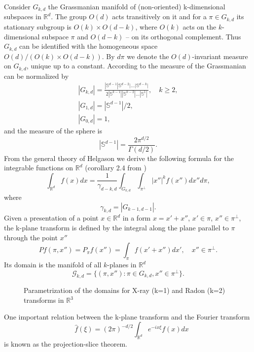 \documentclass[12pt]{iopart}
\begin{document}
	Consider $G_{k,d}$ the Grassmanian manifold of (non-oriented) k-dimensional subspaces in $\mathbb R^d$. The group $O(d)$ acts transitively on it and for a $\pi\in G_{k,d}$ its stationary subgroup is $O(k)\times O(d-k)$, where $O(k)$ acts on the $k$-dimensional subspace $\pi$ and $O(d-k)$ -- on its orthogonal complement. Thus $G_{k,d}$ can be identified with the homogeneous space $O(d)/(O(k)\times O(d-k))$. By $d\pi$ we denote the $O(d)$-invariant measure on $G_{k,d}$, unique up to a constant.  According to \cite{Sa} the measure of the Grassmanian can be normalized by
	\begin{eqnarray*}
		|G_{k,d}|=\frac{|\mathbb S^{d-1}|\mathbb S^{d-2}|\dots|\mathbb S^{d-k}|}{2|\mathbb S^{k-1}||\mathbb S^{k-2}|\dots|\mathbb S^1|},\quad k\geqslant2,\\
		|G_{1,d}|=|\mathbb S^{d-1}|/2,\\
		|G_{0,d}|=1,
	\end{eqnarray*}
	and the measure of the sphere is
	$$
	|\mathbb S^{d-1}|=\frac{2\pi^{d/2}}{\Gamma(d/2)}.
	$$
	From the general theory of Helgason \cite{H} we derive the following formula for the integrable functions on $\mathbb R^d$ (corollary 2.4 from \cite{K})
	\begin{equation}
	\label{integral}
	\int_{\mathbb R^d}f(x)dx=\frac{1}{\gamma_{d-k,d}}\int_{G_{k,d}}\int_{\pi^\perp}|x''|^kf(x'')dx''d\pi,
	\end{equation}
	where
	$$
	\gamma_{k,d}=|G_{k-1,d-1}|.
	$$
	Given a presentation of a point $x\in\mathbb R^d$ in a form $x=x'+x''$, $x'\in\pi$, $x''\in\pi^\perp$, the k-plane transform is defined by the integral along the plane parallel to $\pi$ through the point $x''$
	$$Pf(\pi,x'')=P_\pi f(x'')=\int_{\pi}f(x'+x'')dx',\quad x''\in\pi^\perp.$$
	Its domain is the manifold of all $k$-planes in $\mathbb R^d$ 
	$$\mathcal G_{k,d}=\{(\pi,x''):\pi\in G_{k,d}, x''\in\pi^\perp\}.$$
	
	\begin{figure}[h]
		\caption{Parametrization of the domains for X-ray (k=1) and Radon (k=2) transforms in $\mathbb R^3$}
		\label{some example}
	\end{figure}
	One important relation between the k-plane transform and the Fourier transform
	$$\quad \widehat f(\xi)=(2\pi)^{-d/2}\int_{\mathbb R^d}e^{-ix\xi}f(x)dx$$
	is  known as the projection-slice theorem. 
	
\end{document}
